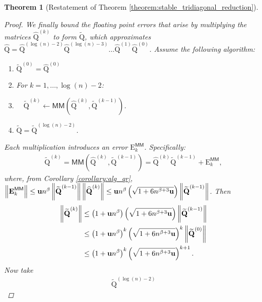 \documentclass{article}
\newcommand{\lnorm}{\left\|}
\newcommand{\rnorm}{\right\|}
\newcommand{\lpar}{\left(}
\newcommand{\rpar}{\right)}
\newtheorem{theorem}{Theorem}[section]
\newcommand\matE{\boldsymbol{\mathrm{E}}}
\newcommand\matQtilde{\widetilde{\boldsymbol{\mathrm{Q}}}}
\newcommand\matQhat{\widehat{\boldsymbol{\mathrm{Q}}}}
\newcommand{\umach}{\textbf{\textup{u}}}
\newcommand{\MM}{\mathsf{MM}}
\newcommand{\cmm}{\beta}
\begin{document}
\begin{theorem}[Restatement of Theorem \ref{theorem:stable_tridiagonal_reduction}]
\begin{proof}
        We finally bound the floating point errors that arise by multiplying the matrices $\matQhat^{(k)}$ to form $\matQtilde$, which approximates $\matQhat=\matQhat^{(\log(n)-2)}\matQhat^{(\log(n)-3)}\ldots \matQhat^{(1)}\matQhat^{(0)}$. Assume the following algorithm:
        \begin{enumerate}
            \item $\matQtilde^{(0)}=\matQhat^{(0)}$
            \item For $k=1,\ldots,\log(n)-2$:
            \item $\quad \matQtilde^{(k)}\leftarrow  \MM(\matQhat^{(k)},\matQtilde^{(k-1)})$.
            \item $\matQtilde=\matQtilde^{(\log(n)-2)}$.
        \end{enumerate}
        Each multiplication introduces an error $\matE^{ \MM}_{k}$. Specifically:
        \begin{align*}
            \matQtilde^{(k)} = 
             \MM(\matQhat^{(k)},\matQtilde^{(k-1)}) 
            = 
            \matQhat^{(k)}\matQtilde^{(k-1)} + \matE^{ \MM}_{k},
        \end{align*}
        where, from Corollary \ref{corollary:alg_qr}, $\lnorm \matE_k^{ \MM}\rnorm 
        \leq 
        \umach n^{\cmm} \lnorm  \matQtilde^{(k-1)} \rnorm \lnorm \matQhat^{(k)} \rnorm 
        \leq
        \umach n^{\cmm} \lpar \sqrt{1+6n^{\cmm+3}\umach} \rpar \lnorm  \matQtilde^{(k-1)} \rnorm 
        $.
        Then
        \begin{align*}
            \lnorm 
                 \matQtilde^{(k)}
            \rnorm 
            &\leq
            \lpar
                1+\umach n^{\beta}
            \rpar
            \lpar
                \sqrt{1+6n^{\cmm+3}\umach} 
            \rpar
            \lnorm  
                \matQtilde^{(k-1)} 
            \rnorm
            \\
            &\leq
            \lpar
                1+\umach n^{\beta}
            \rpar^{k}
            \lpar
                \sqrt{1+6n^{\cmm+3}\umach}
            \rpar^{k} 
            \lnorm  
                \matQtilde^{(0)} 
            \rnorm
            \\
            &\leq
            \lpar
                1+\umach n^{\beta}
            \rpar^{k}
            \lpar
                \sqrt{1+6n^{\cmm+3}\umach}
            \rpar^{k+1}. 
        \end{align*}
        Now take
        \begin{align*}
            \matQtilde^{(\log(n)-2)} 

\end{align*}
\end{proof}
\end{theorem}
\end{document}
